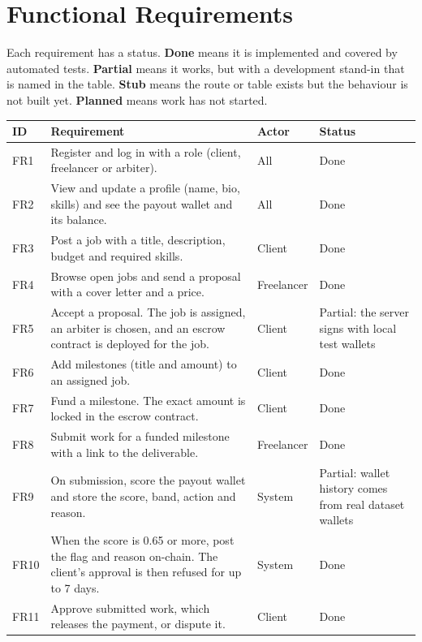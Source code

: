 \chapter{Functional Requirements}
\label{ch:fr}

Each requirement has a status. \textbf{Done} means it is implemented and covered by automated tests. \textbf{Partial} means it works, but with a development stand-in that is named in the table. \textbf{Stub} means the route or table exists but the behaviour is not built yet. \textbf{Planned} means work has not started.

\begin{table}[htbp]
\centering
\footnotesize
\renewcommand{\arraystretch}{1.15}
\begin{tabularx}{\textwidth}{>{\raggedright\arraybackslash}p{0.9cm}L>{\raggedright\arraybackslash}p{1.9cm}>{\raggedright\arraybackslash}p{2.6cm}}
\hline
\textbf{ID} & \textbf{Requirement} & \textbf{Actor} & \textbf{Status} \\ \hline
FR1 & Register and log in with a role (client, freelancer or arbiter). & All & Done \\
FR2 & View and update a profile (name, bio, skills) and see the payout wallet and its balance. & All & Done \\
FR3 & Post a job with a title, description, budget and required skills. & Client & Done \\
FR4 & Browse open jobs and send a proposal with a cover letter and a price. & Freelancer & Done \\
FR5 & Accept a proposal. The job is assigned, an arbiter is chosen, and an escrow contract is deployed for the job. & Client & Partial: the server signs with local test wallets \\
FR6 & Add milestones (title and amount) to an assigned job. & Client & Done \\
FR7 & Fund a milestone. The exact amount is locked in the escrow contract. & Client & Done \\
FR8 & Submit work for a funded milestone with a link to the deliverable. & Freelancer & Done \\
FR9 & On submission, score the payout wallet and store the score, band, action and reason. & System & Partial: wallet history comes from real dataset wallets \\
FR10 & When the score is 0.65 or more, post the flag and reason on-chain. The client's approval is then refused for up to 7 days. & System & Done \\
FR11 & Approve submitted work, which releases the payment, or dispute it. & Client & Done \\

\end{tabularx}
\end{table}
